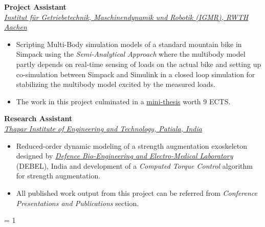 \vspace{0.1 in}

\large{\textbf{Project Assistant}}
\hfill
\minithesisdate\\
\href{https://www.igmr.rwth-aachen.de/cms/~jkhpl/igmr/}{\large{\emph{Institut für Getriebetechnik, Maschinendynamik und Robotik (IGMR), RWTH Aachen}}}
\begin{itemize}
\item \large{Scripting Multi-Body simulation models of a standard mountain bike in Simpack using the \emph{Semi-Analytical Approach} where the multibody model partly depends on real-time sensing of loads on the actual bike and setting up co-simulation between Simpack and Simulink in a closed loop simulation for stabilizing the multibody model excited by the measured loads. }
\item\large{The work in this project culminated in a \href{https://github.com/average-engineer/MiniThesis_IGMR/blob/master/Thesis.pdf}{\large{mini-thesis}} worth 9 ECTS.}
\end{itemize}

\vspace{0.1 in}

\large{\textbf{Research Assistant}}
\hfill
\drdodate\\
\href{https://www.thapar.edu/}{\large{\emph{Thapar Institute of Engineering and Technology, Patiala, India}}}
\begin{itemize}
\item\large{Reduced-order dynamic modeling of a strength augmentation exoskeleton designed by \href{https://www.drdo.gov.in/drdo/labs-and-establishments/defence-bio-engineering-electro-medical-laboratory-debel}{\large{\emph{Defence Bio-Engineering and Electro-Medical Laboratory}}} (DEBEL), India and development of a \emph{Computed Torque Control} algorithm for strength augmentation.}
\item\large{All published work output from this project can be referred from \emph{Conference Presentations and Publications} section.}
\end{itemize}

\ifnum\teach = 1
	\vspace{0.1 in}
	
